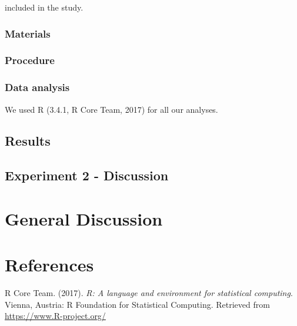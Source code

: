 \documentclass[english,man]{apa6}
\theoremstyle{definition}
\theoremstyle{definition}
\theoremstyle{remark}
\begin{document}
included in the study.

\subsubsection{Materials}\label{materials}

\subsubsection{Procedure}\label{procedure-1}

\subsubsection{Data analysis}\label{data-analysis-1}

We used R (3.4.1, R Core Team, 2017) for all our analyses.

\subsection{Results}\label{results}

\subsection{Experiment 2 - Discussion}\label{experiment-2---discussion}

\section{General Discussion}\label{general-discussion}

\newpage

\section{References}\label{references}

\setlength{\parindent}{-0.5in} \setlength{\leftskip}{0.5in}

\hypertarget{refs}{}
\hypertarget{ref-R-base}{}
R Core Team. (2017). \emph{R: A language and environment for statistical
computing}. Vienna, Austria: R Foundation for Statistical Computing.
Retrieved from \url{https://www.R-project.org/}
\end{document}
